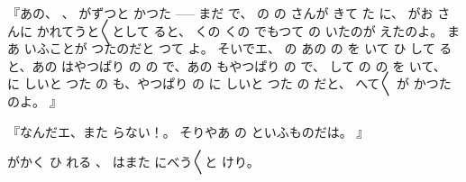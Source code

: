 『あの、
、
がずつと
かつた
\------ まだ
で、
の
の
さんが
きて
た
に、
がお
さんに
かれてうと〳〵として
ると、
くの
くの
でもつて
の
いたのが
えたのよ。
まあ
いふことが
つたのだと
つて
よ。
そいでエ、
の
あの
の
を
いて
ひ
して
ると、あの
はやつぱり
の
の
で、あの
もやつぱり
の
で、
して
の
の
を
いて、
に
しいと
つた
の
も、やつぱり
の
に
しいと
つた
の
だと、
へて〳〵
が
かつたのよ。
』

『なんだエ、また
らない！。
そりやあ
の
といふものだは。
』

がかく
ひ
れる
、
はまた
にべう〳〵と
けり。

